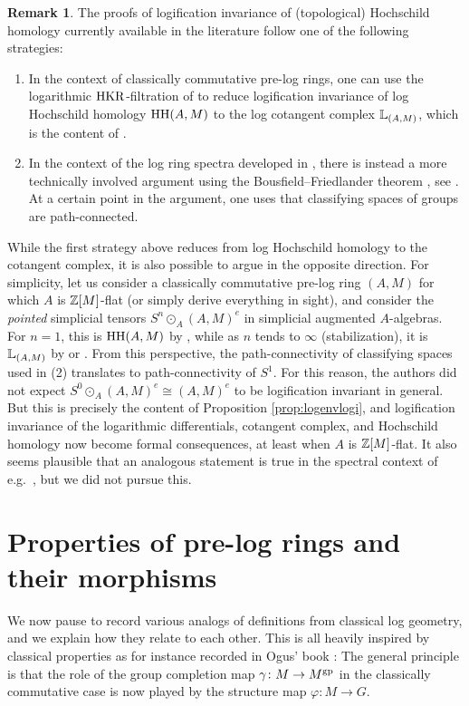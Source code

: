\documentclass[a4paper,10pt%
]{amsart}
\numberwithin{equation}{section}
\theoremstyle{definition}
\newtheorem{remark}[subsection]{Remark}
\renewcommand{\:}{\colon}
\begin{document}
\begin{remark}\label{rem:logenvlogi} The proofs of logification invariance of (topological) Hochschild homology currently available in the literature follow one of the following strategies:
    
    \begin{enumerate}
        \item In the context of classically commutative pre-log rings, one can use the logarithmic ${\rm HKR}$-filtration of \cite[Theorem 1.1]{BLPO23a} to reduce logification invariance of log Hochschild homology ${\rm HH}(A, M)$ to the log cotangent complex ${\Bbb L}_{(A, M)}$, which is the content of \cite[Theorem 8.16]{Ols05}.
        \item In the context of the log ring spectra developed in \cites{Rog09, RSS15, RSS18, RSS26}, there is instead a more technically involved argument using the Bousfield--Friedlander theorem \cite[Theorem B.4]{BF78}, see \cite[Theorem 4.24]{RSS15}. At a certain point in the argument, one uses that classifying spaces of groups are path-connected. 
    \end{enumerate}
\noindent While the first strategy above reduces from log Hochschild homology to the cotangent complex, it is also possible to argue in the opposite direction. For simplicity, let us consider a classically commutative pre-log ring $(A, M)$ for which $A$ is ${\Bbb Z}[M]$-flat (or simply derive everything in sight), and consider the \emph{pointed} simplicial tensors $S^n \odot_A (A, M)^e$ in simplicial augmented $A$-algebras. For $n = 1$, this is ${\rm HH}(A, M)$ by \cite[Proposition 5.8]{Lun21}, while as $n$ tends to $\infty$ (stabilization), it is ${\Bbb L}_{(A, M)}$ by \cite[Section 9]{Lun21} or \cite[Section 13]{Rog09}. From this perspective, the path-connectivity of classifying spaces used in (2) translates to path-connectivity of $S^1$. For this reason, the authors did not expect $S^0 \odot_A (A, M)^e \cong (A, M)^e$ to be logification invariant in general. But this is precisely the content of Proposition \ref{prop:logenvlogi}, and logification invariance of the logarithmic differentials, cotangent complex, and Hochschild homology now become formal consequences, at least when $A$ is ${\Bbb Z}[M]$-flat. It also seems plausible that an analogous statement is true in the spectral context of e.g.\ \cite{RSS26}, but we did not pursue this. 
\end{remark}


\section{Properties of pre-log rings and their morphisms}\label{sec:properties} We now pause to record various analogs of definitions from classical log geometry, and we explain how they relate to each other. This is all heavily inspired by classical properties as for instance recorded in Ogus' book \cite{Ogu18}: The general principle is that the role of the group completion map $\gamma \colon M \to M^{\rm gp}$ in the classically commutative case is now played by the structure map $\varphi \colon M \to G$. 
\end{document}

